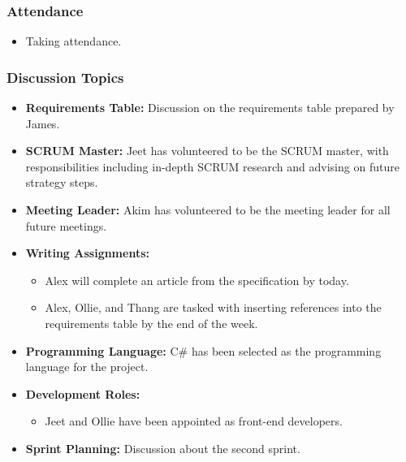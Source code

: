 \documentclass[11pt]{article}
\begin{document}
\hypertarget{attendance-1}{%
\subsubsection{Attendance}\label{attendance-1}}

\begin{itemize}
\tightlist
\item
  Taking attendance.
\end{itemize}

\hypertarget{discussion-topics}{%
\subsubsection{Discussion Topics}\label{discussion-topics}}

\begin{itemize}
\tightlist
\item
  \textbf{Requirements Table:} Discussion on the requirements table
  prepared by James.
\item
  \textbf{SCRUM Master:} Jeet has volunteered to be the SCRUM master,
  with responsibilities including in-depth SCRUM research and advising
  on future strategy steps.
\item
  \textbf{Meeting Leader:} Akim has volunteered to be the meeting leader
  for all future meetings.
\item
  \textbf{Writing Assignments:}

  \begin{itemize}
  \tightlist
  \item
    Alex will complete an article from the specification by today.
  \item
    Alex, Ollie, and Thang are tasked with inserting references into the
    requirements table by the end of the week.
  \end{itemize}
\item
  \textbf{Programming Language:} C\# has been selected as the
  programming language for the project.
\item
  \textbf{Development Roles:}

  \begin{itemize}
  \tightlist
  \item
    Jeet and Ollie have been appointed as front-end developers.
  \end{itemize}
\item
  \textbf{Sprint Planning:} Discussion about the second sprint.
\end{itemize}
\end{document}
